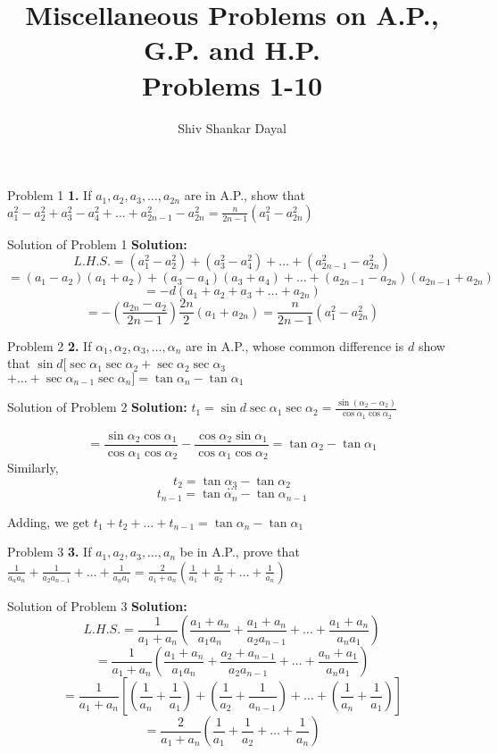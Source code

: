 \documentclass[aspectratio=1610,8pt]{beamer}
\title{Miscellaneous Problems on A.P., G.P. and H.P.\\Problems 1-10}
\author[Shiv Shankar Dayal]{Shiv Shankar Dayal}
\begin{document}
\begin{frame}
  \titlepage
\end{frame}
\begin{frame}{Problem 1}
  \textbf{1.} If $a_1, a_2, a_3, \ldots, a_{2n}$ are in A.P., show that $a_1^2 - a_2^2 + a_3^2 - a_4^2 + \ldots + a_{2n - 1}^2 -
  a_{2n}^2 = \frac{n}{2n - 1}(a_1^2 - a_{2n}^2)$
\end{frame}
\begin{frame}{Solution of Problem 1}
  \textbf{Solution:} $$L.H.S. = (a_1^2 - a_2^2) + (a_3^2 - a_4^2) + \ldots + (a_{2n - 1}^2 - a_{2n}^2)$$
  $$= (a_1 - a_2)(a_1 + a_2) + (a_3 - a_4)(a_3 + a_4) + \ldots + (a_{2n - 1} - a_{2n})(a_{2n - 1} + a_{2n})$$
  $$= -d(a_1 + a_2 + a_3 + \ldots + a_{2n})$$
  $$= -\left(\frac{a_{2n} - a_2}{2n - 1}\right)\frac{2n}{2}(a_1 + a_{2n}) = \frac{n}{2n - 1}(a_1^2 - a_{2n}^2)$$
\end{frame}
\begin{frame}{Problem 2}
  \textbf{2.} If $\alpha_1, \alpha_2, \alpha_3, \ldots, \alpha_n$ are in A.P., whose common difference is $d$ show that $\sin
  d[\sec\alpha_1\sec\alpha_2 + \sec\alpha_2\sec\alpha_3$ $+ \ldots + \sec\alpha_{n - 1}\sec\alpha_n] = \tan\alpha_n - \tan\alpha_1$
\end{frame}
\begin{frame}{Solution of Problem 2}
  \textbf{Solution:} $t_1 = \sin d\sec\alpha_1\sec\alpha_2 = \frac{\sin(\alpha_2 - \alpha_2)}{\cos\alpha_1\cos\alpha_2}$

  $$=\frac{\sin\alpha_2\cos\alpha_1}{\cos\alpha_1\cos\alpha_2} - \frac{\cos\alpha_2\sin\alpha_1}{\cos\alpha_1\cos\alpha_2} =
  \tan\alpha_2 - \tan\alpha_1$$
  Similarly, $$t_2 = \tan\alpha_3 - \tan\alpha_2$$
  $$\ldots$$
  $$t_{n - 1} = \tan\alpha_n - \tan\alpha_{n - 1}$$

  Adding, we get $t_1 + t_2 + \ldots + t_{n - 1} = \tan\alpha_n - \tan\alpha_1$
\end{frame}
\begin{frame}{Problem 3}
  \textbf{3.} If $a_1, a_2, a_3, \ldots, a_n$ be in A.P., prove that $\frac{1}{a_aa_n} + \frac{1}{a_2a_{n - 1}} + \ldots +
  \frac{1}{a_na_1} = \frac{2}{a_1 + a_n}\left(\frac{1}{a_1} + \frac{1}{a_2} + \ldots + \frac{1}{a_n}\right)$
\end{frame}
\begin{frame}{Solution of Problem 3}
  \textbf{Solution:}$$L.H.S. = \frac{1}{a_1 + a_n}\left(\frac{a_1 + a_n}{a_1a_n} + \frac{a_1 + a_n}{a_2a_{n - 1}} + \ldots +
  \frac{a_1 + a_n}{a_na_1}\right)$$
  $$= \frac{1}{a_1 + a_n}\left(\frac{a_1 + a_n}{a_1a_n} + \frac{a_2 + a_{n - 1}}{a_2a_{n - 1}} + \ldots + \frac{a_n +
    a_1}{a_na_1}\right)$$
  $$= \frac{1}{a_1 + a_n}\left[\left(\frac{1}{a_n} + \frac{1}{a_1}\right) + \left(\frac{1}{a_2} + \frac{1}{a_{n - 1}}\right) +
    \ldots + \left(\frac{1}{a_n} + \frac{1}{a_1}\right)\right]$$
  $$= \frac{2}{a_1 + a_n}\left(\frac{1}{a_1} + \frac{1}{a_2} + \ldots + \frac{1}{a_n}\right)$$
\end{frame}
\end{document}
